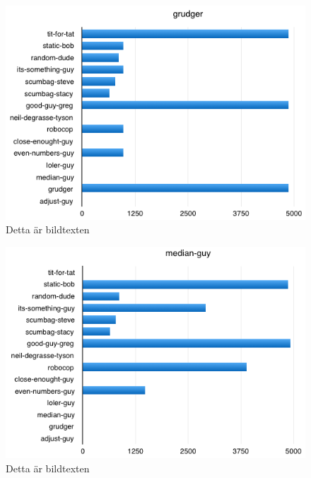 \begin{figure}[htb]
	\begin{center}
	\includegraphics[scale=0.75, angle=0]{bilder/grudger.png}
	\caption{Detta är bildtexten}
	\label{grudger}
	\end{center}
\end{figure}

\begin{figure}[htb]
	\begin{center}
	\includegraphics[scale=0.75, angle=0]{bilder/median-guy.png}
	\caption{Detta är bildtexten}
	\label{median-guy}
	\end{center}
\end{figure}

